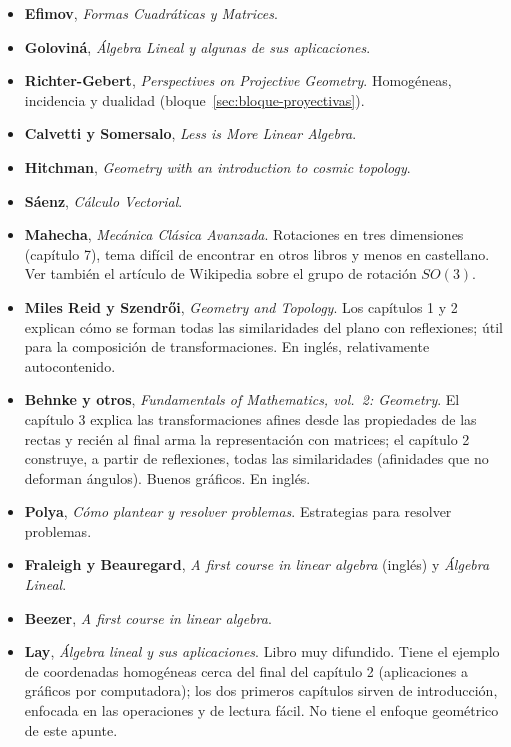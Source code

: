 \begin{itemize}
  \item \textbf{Efimov}, \emph{Formas Cuadráticas y Matrices}.
  \item \textbf{Goloviná}, \emph{Álgebra Lineal y algunas de sus aplicaciones}.
  \item \textbf{Richter-Gebert}, \emph{Perspectives on Projective Geometry}. Homogéneas, incidencia y
  dualidad (bloque~\ref{sec:bloque-proyectivas}).
  \item \textbf{Calvetti y Somersalo}, \emph{Less is More Linear Algebra}.
  \item \textbf{Hitchman}, \emph{Geometry with an introduction to cosmic topology}.
  \item \textbf{Sáenz}, \emph{Cálculo Vectorial}.
  \item \textbf{Mahecha}, \emph{Mecánica Clásica Avanzada}. Rotaciones en tres
  dimensiones (capítulo 7), tema difícil de encontrar en otros libros y menos en castellano.
  Ver también el artículo de Wikipedia sobre el grupo de rotación \(SO(3)\).
  \item \textbf{Miles Reid y Szendr\H{o}i}, \emph{Geometry and Topology}. Los capítulos 1 y 2 explican
  cómo se forman todas las similaridades del plano con reflexiones; útil para la composición
  de transformaciones. En inglés, relativamente autocontenido.
  \item \textbf{Behnke y otros}, \emph{Fundamentals of Mathematics, vol.~2: Geometry}. El capítulo 3 explica las
  transformaciones afines desde las propiedades de las rectas y recién al final arma la
  representación con matrices; el capítulo 2 construye, a partir de reflexiones, todas las
  similaridades (afinidades que no deforman ángulos). Buenos gráficos. En inglés.
  \item \textbf{Polya}, \emph{Cómo plantear y resolver problemas}. Estrategias para resolver
  problemas.
  \item \textbf{Fraleigh y Beauregard}, \emph{A first course in linear algebra} (inglés) y
  \emph{Álgebra Lineal}.
  \item \textbf{Beezer}, \emph{A first course in linear algebra}.
  \item \textbf{Lay}, \emph{Álgebra lineal y sus aplicaciones}. Libro muy difundido. Tiene el ejemplo de
  coordenadas homogéneas cerca del final del capítulo 2 (aplicaciones a gráficos por
  computadora); los dos primeros capítulos sirven de introducción, enfocada en las operaciones
  y de lectura fácil. No tiene el enfoque geométrico de este apunte.
\end{itemize}


